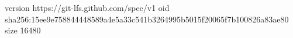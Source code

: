version https://git-lfs.github.com/spec/v1
oid sha256:15ee9e758844448589a4e5a33c541b3264995b5015f20065f7b100826a83ae80
size 16480

